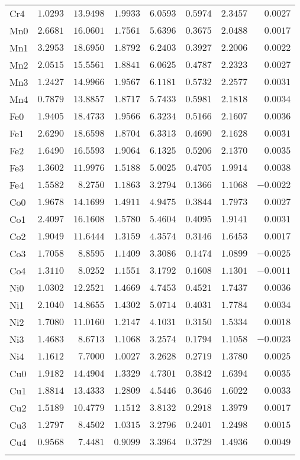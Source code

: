 \begin{table}[H]
{\begin{tabular}{lrrrrrrr}
Cr4 &$1.0293$ &$13.9498$ &$1.9933$ &$6.0593$ &$0.5974$ &$2.3457$ &$0.0027$ \\
Mn0 &$2.6681$ &$16.0601$ &$1.7561$ &$5.6396$ &$0.3675$ &$2.0488$ &$0.0017$ \\
Mn1 &$3.2953$ &$18.6950$ &$1.8792$ &$6.2403$ &$0.3927$ &$2.2006$ &$0.0022$ \\
Mn2 &$2.0515$ &$15.5561$ &$1.8841$ &$6.0625$ &$0.4787$ &$2.2323$ &$0.0027$ \\
Mn3 &$1.2427$ &$14.9966$ &$1.9567$ &$6.1181$ &$0.5732$ &$2.2577$ &$0.0031$ \\
Mn4 &$0.7879$ &$13.8857$ &$1.8717$ &$5.7433$ &$0.5981$ &$2.1818$ &$0.0034$ \\
Fe0 &$1.9405$ &$18.4733$ &$1.9566$ &$6.3234$ &$0.5166$ &$2.1607$ &$0.0036$ \\
Fe1 &$2.6290$ &$18.6598$ &$1.8704$ &$6.3313$ &$0.4690$ &$2.1628$ &$0.0031$ \\
Fe2 &$1.6490$ &$16.5593$ &$1.9064$ &$6.1325$ &$0.5206$ &$2.1370$ &$0.0035$ \\
Fe3 &$1.3602$ &$11.9976$ &$1.5188$ &$5.0025$ &$0.4705$ &$1.9914$ &$0.0038$ \\
Fe4 &$1.5582$ &$8.2750$ &$1.1863$ &$3.2794$ &$0.1366$ &$1.1068$ &$-0.0022$ \\
Co0 &$1.9678$ &$14.1699$ &$1.4911$ &$4.9475$ &$0.3844$ &$1.7973$ &$0.0027$ \\
Co1 &$2.4097$ &$16.1608$ &$1.5780$ &$5.4604$ &$0.4095$ &$1.9141$ &$0.0031$ \\
Co2 &$1.9049$ &$11.6444$ &$1.3159$ &$4.3574$ &$0.3146$ &$1.6453$ &$0.0017$ \\
Co3 &$1.7058$ &$8.8595$ &$1.1409$ &$3.3086$ &$0.1474$ &$1.0899$ &$-0.0025$ \\
Co4 &$1.3110$ &$8.0252$ &$1.1551$ &$3.1792$ &$0.1608$ &$1.1301$ &$-0.0011$ \\
Ni0 &$1.0302$ &$12.2521$ &$1.4669$ &$4.7453$ &$0.4521$ &$1.7437$ &$0.0036$ \\
Ni1 &$2.1040$ &$14.8655$ &$1.4302$ &$5.0714$ &$0.4031$ &$1.7784$ &$0.0034$ \\
Ni2 &$1.7080$ &$11.0160$ &$1.2147$ &$4.1031$ &$0.3150$ &$1.5334$ &$0.0018$ \\
Ni3 &$1.4683$ &$8.6713$ &$1.1068$ &$3.2574$ &$0.1794$ &$1.1058$ &$-0.0023$ \\
Ni4 &$1.1612$ &$7.7000$ &$1.0027$ &$3.2628$ &$0.2719$ &$1.3780$ &$0.0025$ \\
Cu0 &$1.9182$ &$14.4904$ &$1.3329$ &$4.7301$ &$0.3842$ &$1.6394$ &$0.0035$ \\
Cu1 &$1.8814$ &$13.4333$ &$1.2809$ &$4.5446$ &$0.3646$ &$1.6022$ &$0.0033$ \\
Cu2 &$1.5189$ &$10.4779$ &$1.1512$ &$3.8132$ &$0.2918$ &$1.3979$ &$0.0017$ \\
Cu3 &$1.2797$ &$8.4502$ &$1.0315$ &$3.2796$ &$0.2401$ &$1.2498$ &$0.0015$ \\
Cu4 &$0.9568$ &$7.4481$ &$0.9099$ &$3.3964$ &$0.3729$ &$1.4936$ &$0.0049$ \\
\hline\\[-2ex]
\end{tabular}
}
\end{table}
